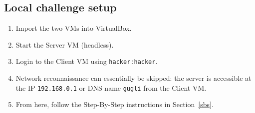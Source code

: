 \documentclass[11pt, a4paper]{article}
\begin{document}
\subsection{Local challenge setup}

\begin{enumerate}
    \item Import the two VMs into VirtualBox.
    \item Start the Server VM (headless).
    \item Login to the Client VM using \texttt{hacker:hacker}.
    \item Network reconnaissance can essentially be skipped: the server is accessible at the IP \texttt{192.168.0.1} or DNS name \texttt{gugli}
    from the Client VM.
    \item From here, follow the Step-By-Step instructions in Section~\ref{sbs}.
\end{enumerate}


\end{document}
